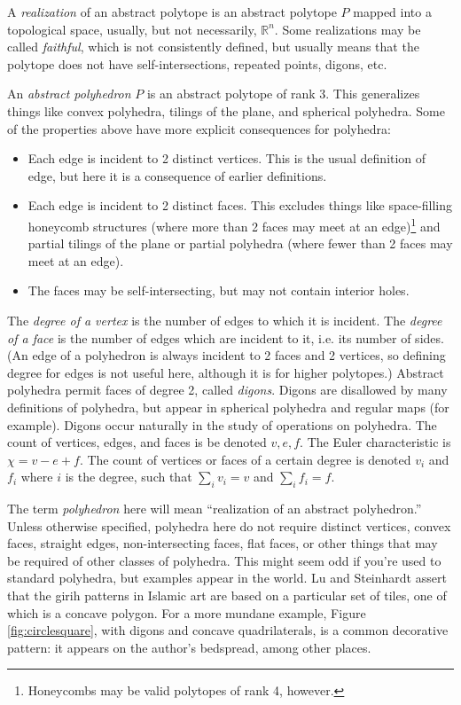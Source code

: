 \documentclass[12pt]{amsart}%
\begin{document}
A \textit{realization} of an abstract polytope is an abstract polytope $P$
mapped into a topological space, usually, but not necessarily, $\mathbb{R}^n$.
Some realizations may be called \textit{faithful}, which is not consistently
defined, but usually means that the polytope does not have self-intersections,
repeated points, digons, etc.

An \textit{abstract polyhedron} $P$ is an abstract polytope of rank 3. This
generalizes things like convex polyhedra, tilings of the plane,
and spherical polyhedra. Some of the properties above have more
explicit consequences for polyhedra: \cite{grunbaum03}
\begin{itemize}
  \item Each edge is incident to 2 distinct vertices. This is the usual
  definition of edge, but here it is a consequence of earlier definitions.
  \item Each edge is incident to 2 distinct faces. This excludes things like
  space-filling honeycomb structures (where more than 2 faces may meet at an
  edge)\footnote{Honeycombs may be valid polytopes of rank 4, however.} and
  partial tilings of the plane or partial polyhedra (where fewer than 2 faces may meet at an edge).
  \item The faces may be self-intersecting, but may not contain interior holes.
\end{itemize}
The \textit{degree of a vertex} is the number of edges to which it is incident.
The \textit{degree of a face} is the number of edges which are incident to it,
i.e. its number of sides. (An edge of a polyhedron is always incident to 2
faces and 2 vertices, so defining degree for edges is not useful here, although
it is for higher polytopes.)
Abstract polyhedra permit faces of degree 2, called \textit{digons}. Digons are
disallowed by many definitions of polyhedra, but appear in spherical polyhedra
and regular maps (for example). Digons occur naturally in the study of
operations on polyhedra. The count of vertices, edges, and faces is be denoted
$v, e, f$. The Euler characteristic is $\chi = v - e + f$. The count of
vertices or faces of a certain degree is denoted $v_i$ and $f_i$ where $i$ is
the degree, such that $\sum_i v_i = v$ and $\sum_i f_i = f$.

The term \textit{polyhedron} here will mean ``realization of an abstract
polyhedron.'' Unless otherwise specified, polyhedra here do not require
distinct vertices, convex faces, straight edges, non-intersecting faces, flat
faces, or other things that may be required of other classes of polyhedra. This
might seem odd if you're used to standard polyhedra, but examples appear in the
world. Lu and Steinhardt \cite{lu07} assert that the girih patterns in Islamic
art are based on a particular set of tiles, one of which is a concave polygon.
For a more mundane example, Figure \ref{fig:circlesquare}, with digons and
concave quadrilaterals, is a common decorative pattern: it appears on the
author's bedspread, among other places.
\end{document}
